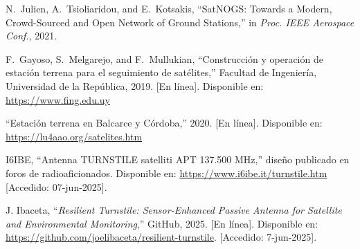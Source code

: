 \documentclass[conference]{IEEEtran}
\begin{document}
\begin{thebibliography}{9}

N.~Julien, A.~Tsioliaridou, and E.~Kotsakis, 
``SatNOGS: Towards a Modern, Crowd-Sourced and Open Network of Ground Stations,'' 
in \textit{Proc. IEEE Aerospace Conf.}, 2021.

F.~Gayoso, S.~Melgarejo, and F.~Mullukian, 
``Construcción y operación de estación terrena para el seguimiento de satélites,'' 
Facultad de Ingeniería, Universidad de la República, 2019. 
[En línea]. Disponible en: \url{https://www.fing.edu.uy}

``Estación terrena en Balcarce y Córdoba,'' 2020. 
[En línea]. Disponible en: \url{https://lu4aao.org/satelites.htm}

I6IBE, “Antenna TURNSTILE satelliti APT 137.500 MHz,” diseño publicado en foros de radioaficionados. Disponible en: \url{https://www.i6ibe.it/turnstile.htm} [Accedido: 07-jun-2025].

J. Ibaceta, “\textit{Resilient Turnstile: Sensor-Enhanced Passive Antenna for Satellite and Environmental Monitoring},” GitHub, 2025. [En línea]. Disponible en: \url{https://github.com/joelibaceta/resilient-turnstile}. [Accedido: 7-jun-2025].

\end{thebibliography}
\end{document}
